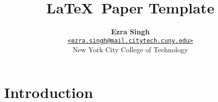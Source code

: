 \documentclass[a4paper]{article}
\title{
        \vspace{-1.5em}
        \textbf{
            \LaTeX\ Paper Template
        }
    }
\author{
        \textbf{Ezra Singh} \\
        \href{mailto:ezra.singh@mail.citytech.cuny.edu}
        \texttt{<ezra.singh@mail.citytech.cuny.edu>} \\
        New York City College of Technology
    }
\begin{document}
    
        \maketitle
    
        \begin{abstract}  \end{abstract}
        
        \tableofcontents
        
        \section{Introduction} \label{sec:introduction} 
        
    
        \nocite{*} %
        
        
        \appendix
    
        
    
    
\end{document}
